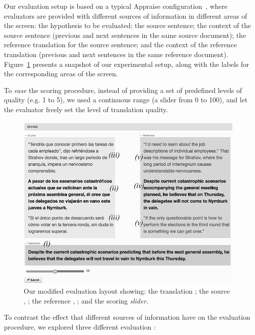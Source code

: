 Our evaluation setup is based on a typical Appraise configuration~\cite{federmann2012appraise}, where %
evaluators are provided with different sources of information in different areas of the screen: 
 \Ni the hypothesis to be evaluated; \Nii the source sentence; \Niii the context of the source sentence (previous and next sentences in the same source document); \Niv the reference translation for the source sentence; and \Nv the context of the reference translation (previous and next sentences in the same reference document). Figure~\ref{fig:EyeAppraiseLayout} presents a snapshot of our experimental setup, along with the labels for the corresponding areas of the screen.

To \emph{ease} the scoring procedure, instead of providing a set of predefined levels of quality (e.g. 1 to 5), we used a continuous range (a slider from 0 to 100), and let the evaluator freely set the level of translation quality. 

\begin{figure}
\centering
\includegraphics[scale=0.80]{data/EyeAppraiseLayout_srctgt.png}
\caption{Our modified evaluation layout showing: the translation \Ni; the source \Nii, \Niii; the reference \Niv, \Nv; and the scoring \emph{slider}.}
\label{fig:EyeAppraiseLayout}
\vspace{-5pt}
\end{figure}

 To contrast the effect that different sources of information have on the evaluation procedure, we explored three different evaluation \gamets:


